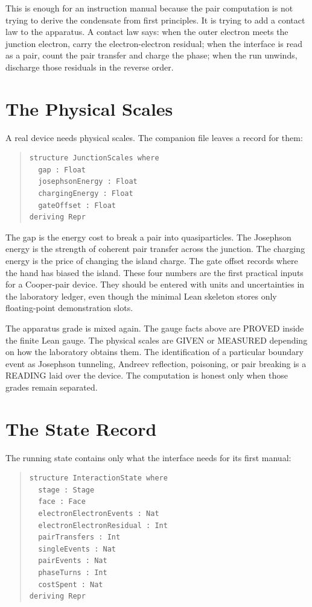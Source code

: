This is enough for an instruction manual because the pair computation is not trying to derive the condensate
from first principles. It is trying to add a contact law to the apparatus. A contact law says: when the outer
electron meets the junction electron, carry the electron-electron residual; when the interface is read as a pair,
count the pair transfer and charge the phase; when the run unwinds, discharge those residuals in the reverse
order.

\section{The Physical Scales}

A real device needs physical scales. The companion file leaves a record for them:

\begin{quote}\small
\begin{verbatim}
structure JunctionScales where
  gap : Float
  josephsonEnergy : Float
  chargingEnergy : Float
  gateOffset : Float
deriving Repr
\end{verbatim}
\end{quote}

The gap is the energy cost to break a pair into quasiparticles. The Josephson energy is the strength of coherent
pair transfer across the junction. The charging energy is the price of changing the island charge. The gate
offset records where the hand has biased the island. These four numbers are the first practical inputs for a
Cooper-pair device. They should be entered with units and uncertainties in the laboratory ledger, even though the
minimal Lean skeleton stores only floating-point demonstration slots.

The apparatus grade is mixed again. The gauge facts above are PROVED inside the finite Lean gauge. The physical
scales are GIVEN or MEASURED depending on how the laboratory obtains them. The identification of a particular
boundary event as Josephson tunneling, Andreev reflection, poisoning, or pair breaking is a READING laid over the
device. The computation is honest only when those grades remain separated.

\section{The State Record}

The running state contains only what the interface needs for its first manual:

\begin{quote}\small
\begin{verbatim}
structure InteractionState where
  stage : Stage
  face : Face
  electronElectronEvents : Nat
  electronElectronResidual : Int
  pairTransfers : Int
  singleEvents : Nat
  pairEvents : Nat
  phaseTurns : Int
  costSpent : Nat
deriving Repr
\end{verbatim}
\end{quote}

